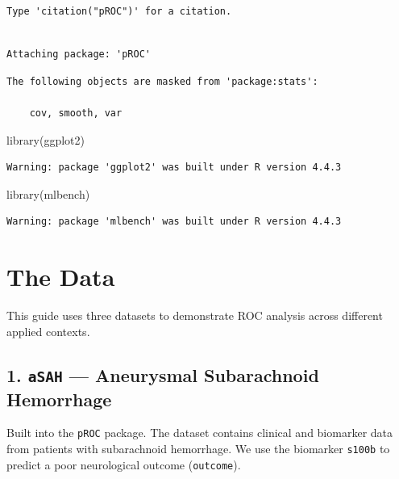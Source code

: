 \documentclass[
  letterpaper,
  DIV=11,
  numbers=noendperiod]{scrreprt}
\newenvironment{Shaded}{\begin{snugshade}}{\end{snugshade}}
\newcommand{\FunctionTok}[1]{\textcolor[rgb]{0.28,0.35,0.67}{#1}}
\newcommand{\NormalTok}[1]{\textcolor[rgb]{0.00,0.23,0.31}{#1}}
\begin{document}
\begin{verbatim}
Type 'citation("pROC")' for a citation.
\end{verbatim}

\begin{verbatim}

Attaching package: 'pROC'
\end{verbatim}

\begin{verbatim}
The following objects are masked from 'package:stats':

    cov, smooth, var
\end{verbatim}

\begin{Shaded}
\begin{Highlighting}[]
\FunctionTok{library}\NormalTok{(ggplot2)}
\end{Highlighting}
\end{Shaded}

\begin{verbatim}
Warning: package 'ggplot2' was built under R version 4.4.3
\end{verbatim}

\begin{Shaded}
\begin{Highlighting}[]
\FunctionTok{library}\NormalTok{(mlbench)}
\end{Highlighting}
\end{Shaded}

\begin{verbatim}
Warning: package 'mlbench' was built under R version 4.4.3
\end{verbatim}

\section{The Data}\label{the-data}

This guide uses three datasets to demonstrate ROC analysis across
different applied contexts.

\subsection{\texorpdfstring{1. \texttt{aSAH} --- Aneurysmal Subarachnoid
Hemorrhage}{1. aSAH --- Aneurysmal Subarachnoid Hemorrhage}}\label{asah-aneurysmal-subarachnoid-hemorrhage}

Built into the \texttt{pROC} package. The dataset contains clinical and
biomarker data from patients with subarachnoid hemorrhage. We use the
biomarker \texttt{s100b} to predict a poor neurological outcome
(\texttt{outcome}).
\end{document}
